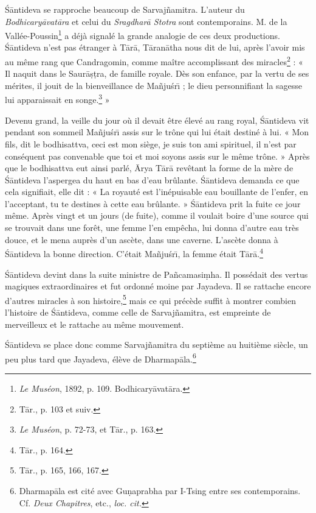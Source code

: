 \documentclass[a4paper, 11pt, oneside, french, landscape, twocolumn]{article}
\begin{document}
\'{S}\={a}ntideva se rapproche beaucoup de Sarvaj\~{n}amitra. L'auteur du \emph{Bodhicary\={a}vat\={a}ra} et celui du \emph{Sragdhar\={a} Stotra} sont contemporains. M. de la Vallée-Poussin\footnote{\emph{Le Muséon}, 1892, p. 109. Bodhicary\={a}vat\={a}ra.} a déjà signalé la grande analogie de ces deux productions. \'{S}\={a}ntideva n'est pas étranger à T\={a}r\={a}, T\={a}ran\={a}tha nous dit de lui, après l'avoir mis au même rang que Candragomin, comme maître accomplissant des miracles\footnote{T\={a}r., p. 103 et suiv.} : « Il naquit dans le Saur\={a}\d{s}\d{t}ra, de famille royale. Dès son enfance, par la vertu de ses mérites, il jouit de la bienveillance de Ma\~{n}ju\'{s}r\={\i} ; le dieu personnifiant la sagesse lui apparaissait en songe.\footnote{\emph{Le Muséon}, p. 72-73, et T\={a}r., p. 163.} »

Devenu grand, la veille du jour où il devait être élevé au rang royal, \'{S}\={a}ntideva vit pendant son sommeil Ma\~{n}ju\'{s}r\={\i} assis sur le trône qui lui était destiné à lui. « Mon fils, dit le bodhisattva, ceci est mon siège, je suis ton ami spirituel, il n'est par conséquent pas convenable que toi et moi soyons assis sur le même trône. » Après que le bodhisattva eut ainsi parlé, \={A}rya T\={a}r\={a} revêtant la forme de la mère de \'{S}\={a}ntideva l'aspergea du haut en bas d'eau brûlante. \'{S}\={a}ntideva demanda ce que cela signifiait, elle dit : « La royauté est l'inépuisable eau bouillante de l'enfer, en l'acceptant, tu te destines à cette eau brûlante. » \'{S}\={a}ntideva prit la fuite ce jour même. Après vingt et un jours (de fuite), comme il voulait boire d'une source qui se trouvait dans une forêt, une femme l'en empêcha, lui donna d'autre eau très douce, et le mena auprès d'un ascète, dans une caverne. L'ascète donna à \'{S}\={a}ntideva la bonne direction. C'était Ma\~{n}ju\'{s}r\={\i}, la femme était T\={a}r\={a}.\footnote{T\={a}r., p. 164.}

\'{S}\={a}ntideva devint dans la suite ministre de Pa\~{n}camasi\d{m}ha. Il possédait des vertus magiques extraordinaires et fut ordonné moine par Jayadeva. Il se rattache encore d'autres miracles à son histoire,\footnote{T\={a}r., p. 165, 166, 167.} mais ce qui précède suffit à montrer combien l'histoire de \'{S}\={a}ntideva, comme celle de Sarvaj\~{n}amitra, est empreinte de merveilleux et le rattache au même mouvement.

\'{S}\={a}ntideva se place donc comme Sarvaj\~{n}amitra du septième au huitième siècle, un peu plus tard que Jayadeva, élève de Dharmap\={a}la.\footnote{Dharmap\={a}la est cité avec Gu\d{n}aprabha par I-Tsing entre ses contemporains. Cf. \emph{Deux Chapitres}, etc., \emph{loc. cit.}}
\end{document}
